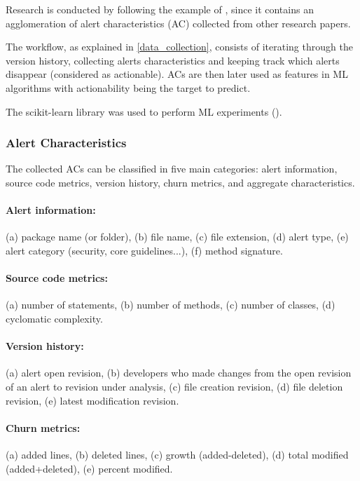 \documentclass{article}
\begin{document}
Research is conducted by following the example of \cite{model_building_actionable}, since it contains an agglomeration of alert characteristics (AC) collected from other research papers.

The workflow, as explained in \cref{data_collection}, consists of iterating through the version history, collecting alerts characteristics and keeping track which alerts disappear (considered as actionable). ACs are then later used as features in ML algorithms with actionability being the target to predict.

The scikit-learn library was used to perform ML experiments (\cite{scikit-learn}).

\subsubsection{Alert Characteristics}

The collected ACs can be classified in five main categories: alert information, source code metrics, version history, churn metrics, and aggregate characteristics.

\paragraph{Alert information:} (a) package name (or folder), (b) file name, (c) file extension, (d) alert type, (e) alert category (security, core guidelines...), (f) method signature.

\paragraph{Source code metrics:} (a) number of statements, (b) number of methods, (c) number of classes, (d) cyclomatic complexity.

\paragraph{Version history:} (a) alert open revision, (b) developers who made changes from the open revision of an alert to revision under analysis, (c) file creation revision, (d) file deletion revision, (e) latest modification revision.

\paragraph{Churn metrics:} (a) added lines, (b) deleted lines, (c) growth (added-deleted), (d) total modified (added+deleted), (e) percent modified.
\end{document}
